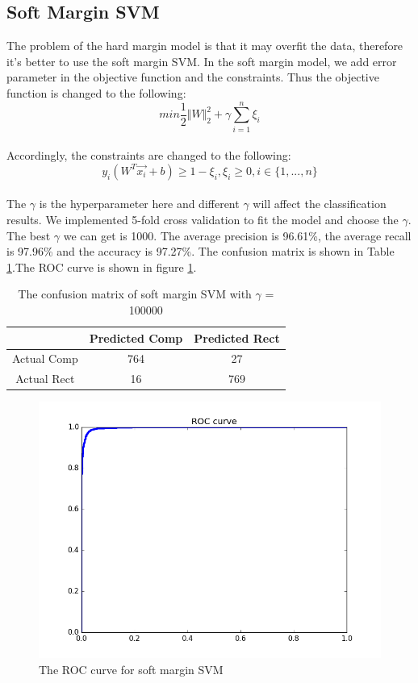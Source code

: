 \documentclass{article}
\begin{document}
\subsection{Soft Margin SVM}
The problem of the hard margin model is that it may overfit the data, therefore it's better to use the soft margin SVM. In the soft margin model, we add error parameter in the objective function and the constraints. Thus the objective function is changed to the following:
\begin{equation*}
min \frac{1}{2}\Vert W \Vert _2 ^2 + \gamma\sum_{i=1}^{n}\xi _i
\end{equation*}
\\
Accordingly, the constraints are changed to the following:
\begin{equation*}
y_i(W^T\overrightarrow{x_i}+b)\geq 1-\xi _i,  \xi _i \geq0,  i\in\lbrace 1, ..., n \rbrace
\end{equation*}
\\
The $\gamma$ is the hyperparameter here and different $\gamma$ will affect the classification results. We implemented 5-fold cross validation to fit the model and choose the $\gamma$.  The best $\gamma$ we can get is 1000. The average precision is 96.61\%, the average recall is 97.96\% and the accuracy is 97.27\%. The confusion matrix is shown in Table \ref{tb:confu_soft}.The ROC curve is shown in figure \ref{fig:roc_soft}.
\begin{table}
\begin{center}
\caption{The confusion matrix of soft margin SVM with $\gamma$ = 100000}
\label{tb:confu_soft}
\begin{tabular}{|c|c|c|}
\hline
& Predicted Comp& Predicted Rect\\
\hline
Actual Comp&764&27\\
\hline
Actual Rect&16&769\\
\hline 	
\end{tabular}
\end{center}
\end{table}

\begin{figure}[htbp]
\centering
\includegraphics[width=.6\textwidth]{roc_soft.png}
\caption{The ROC curve for soft margin SVM}
\label{fig:roc_soft}
\end{figure}
\end{document}
